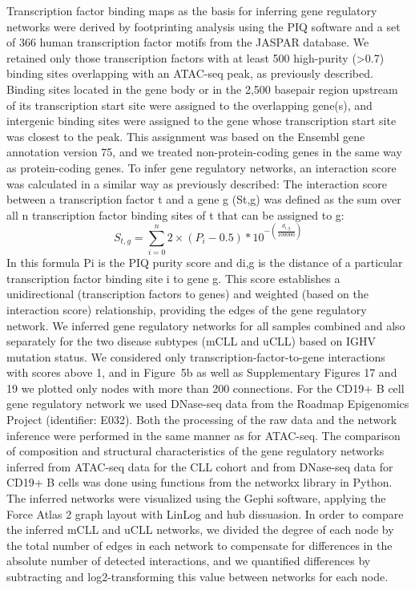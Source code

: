 \documentclass[10pt,]{article}
\begin{document}
Transcription factor binding maps as the basis for inferring gene
regulatory networks were derived by footprinting analysis using the PIQ
software\citep{Sherwood2014} and a set of 366 human transcription factor
motifs from the JASPAR database\citep{Mathelier2014}. We retained only
those transcription factors with at least 500 high-purity
(\textgreater{}0.7) binding sites overlapping with an ATAC-seq peak, as
previously described\citep{Qu2015}. Binding sites located in the gene
body or in the 2,500 basepair region upstream of its transcription start
site were assigned to the overlapping gene(s), and intergenic binding
sites were assigned to the gene whose transcription start site was
closest to the peak. This assignment was based on the Ensembl gene
annotation version 75, and we treated non-protein-coding genes in the
same way as protein-coding genes. To infer gene regulatory networks, an
interaction score was calculated in a similar way as previously
described\citep{Qu2015}: The interaction score between a transcription
factor t and a gene g (St,g) was defined as the sum over all n
transcription factor binding sites of t that can be assigned to g:
%
\begin{equation}
\label{interaction-score}
S_{t,g} = \sum_{i=0}^{n}2 \times (P_{i} - 0.5) * 10 ^{-(\frac{d_{i, g}}{100000})}
\end{equation}
%
 In this formula Pi is the PIQ purity score and di,g is the distance of
a particular transcription factor binding site i to gene g. This score
establishes a unidirectional (transcription factors to genes) and
weighted (based on the interaction score) relationship, providing the
edges of the gene regulatory network. We inferred gene regulatory
networks for all samples combined and also separately for the two
disease subtypes (mCLL and uCLL) based on IGHV mutation status. We
considered only transcription-factor-to-gene interactions with scores
above 1, and in Figure~5b as well as Supplementary Figures 17 and 19 we
plotted only nodes with more than 200 connections. For the CD19+ B cell
gene regulatory network we used DNase-seq data from the Roadmap
Epigenomics Project\citep{Ernst2015} (identifier: E032). Both the
processing of the raw data and the network inference were performed in
the same manner as for ATAC-seq. The comparison of composition and
structural characteristics of the gene regulatory networks inferred from
ATAC-seq data for the CLL cohort and from DNase-seq data for CD19+ B
cells was done using functions from the networkx\citep{Hagberg2008}
library in Python. The inferred networks were visualized using the Gephi
software, applying the Force Atlas 2 graph layout with LinLog and hub
dissuasion. In order to compare the inferred mCLL and uCLL networks, we
divided the degree of each node by the total number of edges in each
network to compensate for differences in the absolute number of detected
interactions, and we quantified differences by subtracting and
log2-transforming this value between networks for each node.
\end{document}
